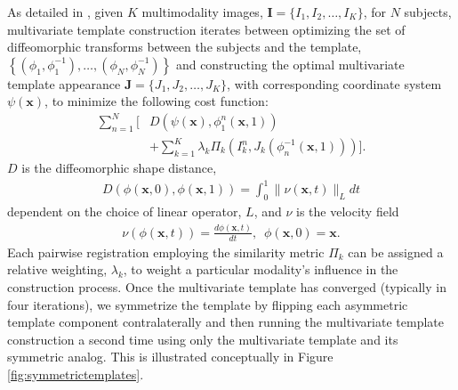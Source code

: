 As detailed in \cite{avants2008,avants2010}, 
given $K$ multimodality images, ${\mathbf I} = \{I_1,I_2,\ldots, I_K\}$, 
for $N$ subjects,  multivariate 
template construction iterates between optimizing the set 
of diffeomorphic transforms between the subjects and the 
template, 
$\left\{\left(\phi_1,\phi_1^{-1}\right),\ldots,\left(\phi_N,\phi_N^{-1}\right)\right\}$ 
and constructing the 
optimal multivariate template appearance 
$\mathbf{J}=\{J_1,J_2,\ldots, J_K\}$, with corresponding 
coordinate system $\psi(\mathbf{x})$, to minimize the
following cost function:
\begin{align}
  \label{test}
  \sum_{n=1}^N \Bigg[ &D \left( \psi(\mathbf{x}),\phi_1^n(\mathbf{x},1)\right) \nonumber  \\
           &+ \sum_{k=1}^K \lambda_k \Pi_k \left(I_k^n,J_k   
           \left(\phi^{-1}_n(\mathbf{x},1)\right)\right)\Bigg].
\end{align}
$D$ is the diffeomorphic shape distance,
\begin{align}
D\left( \phi( \mathbf{x},0),\phi( \mathbf{x},1)\right) = \int_0^1 \| \nu(\mathbf{x},t)\|_L dt
\end{align}
dependent on the choice of linear operator, $L$, and $\nu$
is the velocity field
\begin{align}
\nu\left( \phi(\mathbf{x},t) \right) = \frac{d\phi(\mathbf{x},t)}{dt},\,\,\, \phi(\mathbf{x},0) = \mathbf{x}.
\end{align}
Each pairwise registration employing the similarity metric $\Pi_k$ can 
be assigned a relative weighting, $\lambda_k$, to weight a particular
modality's influence in the construction process.  Once the multivariate
template has converged (typically in four iterations), we symmetrize
the template by flipping each asymmetric template component contralaterally 
and then running the
multivariate template construction a second time using only the multivariate
template and its symmetric analog.  This is illustrated conceptually in
Figure \ref{fig:symmetrictemplates}.

